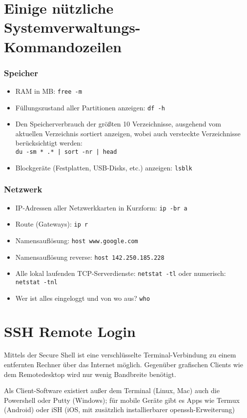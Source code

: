 \documentclass[11pt]{article}
\begin{document}
\section{Einige nützliche Systemverwaltungs-Kommandozeilen}
\subsubsection{Speicher}
\begin{itemize}
  \item RAM in MB: \texttt{free -m}
  \item Füllungszustand aller Partitionen anzeigen: \texttt{df -h}
  \item Den Speicherverbrauch der größten 10 Verzeichnisse, ausgehend vom aktuellen Verzeichnis sortiert anzeigen, wobei auch versteckte Verzeichnisse berücksichtigt werden:\\ \texttt{du -sm  * .* | sort -nr | head}
  \item Blockgeräte (Festplatten, USB-Disks, etc.) anzeigen: \texttt{lsblk}
\end{itemize}
\subsubsection{Netzwerk}
\begin{itemize}
  \item IP-Adressen aller Netzwerkkarten in Kurzform: \texttt{ip -br a}
  \item Route (Gateways): \texttt{ip r}
  \item Namensauflösung: \texttt{host www.google.com}
  \item Namensauflösung reverse: \texttt{host 142.250.185.228}
  \item Alle lokal laufenden TCP-Serverdienste: \texttt{netstat -tl} oder numerisch: \texttt{netstat -tnl}
  \item Wer ist alles eingeloggt und von wo aus? \texttt{who}
\end{itemize}

\section{SSH Remote Login}
Mittels der Secure Shell ist eine verschlüsselte Terminal-Verbindung zu einem entfernten Rechner über das Internet möglich. Gegenüber grafischen Clients wie dem Remotedesktop wird nur wenig Bandbreite benötigt.

Als Client-Software existiert außer dem Terminal (Linux, Mac) auch die Powershell oder Putty (Windows); für mobile Geräte gibt es Apps wie Termux (Android) oder iSH (iOS, mit zusätzlich installierbarer openssh-Erweiterung)
\end{document}
